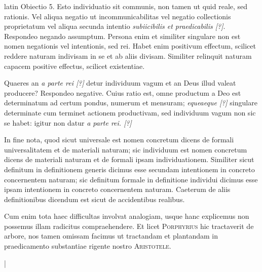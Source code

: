 \begin{otherlanguage*}{latin}
\pstart
 Obiectio 5. Esto individuatio sit communis, non tamen ut quid reale, sed rationis. Vel aliqua negatio ut incommunicabilitas vel negatio collectionis proprietatum vel aliqua secunda intentio \emph{subiicibilis et praedicabilis [?]}. Respondeo negando assumptum. Persona enim et similiter singulare non est nomen negationis vel intentionis, sed rei. Habet enim positivum effectum, scilicet reddere naturam indivisam in se et ab aliis divisam. Similiter relinquit naturam capacem positive effectus, scilicet existentiae. 
\pend

\pstart
 Quaeres an \emph{a parte rei [?]} detur individuum vagum et an Deus illud valeat producere? Respondeo negative. Cuius ratio est, omne productum a Deo est determinatum ad certum pondus, numerum et mensuram; \emph{equeaeque [?]} singulare determinate cum terminet actionem productivam, sed individuum vagum non sic se habet: igitur non datur \emph{a parte rei. [?]} 
\pend

\pstart
 In fine nota, quod sicut universale est nomen concretum dicens de formali universalitatem et de materiali naturam; sic individuum est nomen concretum dicens de materiali naturam et de formali ipsam individuationem. Similiter sicut definitum in definitionem generis dicimus esse secundam intentionem in concreto concernentem naturam; sic definitum formale in definitione individui dicimus esse ipsam intentionem in concreto concernentem naturam. Caeterum de aliis definitionibus dicendum est sicut de accidentibus realibus. 
\pend

\pstart
 Cum enim tota haec difficultas involvat analogiam, usque hanc explicemus non possemus illam radicitus compraehendere. Et licet \textsc{Porphyrius} hic tractaverit de arbore, nos tamen omissam facimus ut tractandam et plantandam in praedicamento substantiae rigente nostro \textsc{Aristotele}. 
\pend

        \pstart
        \pend
      
        \pstart
        \pend
      
\pstart
 \textnormal{|}  
\pend


\end{otherlanguage*}
